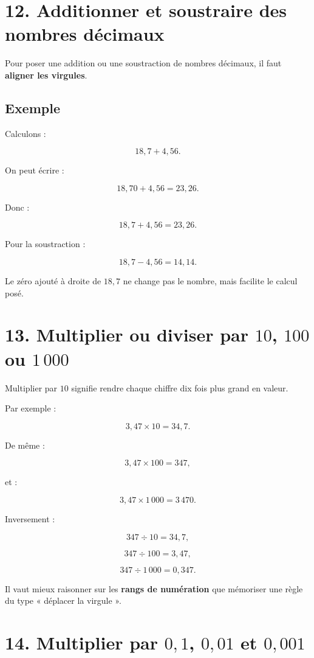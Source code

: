 \section{12. Additionner et soustraire des nombres décimaux}

Pour poser une addition ou une soustraction de nombres décimaux, il faut \textbf{aligner les virgules}.

\subsection{Exemple}

Calculons :

\[
18{,}7+4{,}56.
\]

On peut écrire :

\[
18{,}70+4{,}56=23{,}26.
\]

Donc :

\[
\boxed{18{,}7+4{,}56=23{,}26}.
\]

Pour la soustraction :

\[
18{,}7-4{,}56=14{,}14.
\]

Le zéro ajouté à droite de $18{,}7$ ne change pas le nombre, mais facilite le calcul posé.

\section{13. Multiplier ou diviser par $10$, $100$ ou $1\,000$}

Multiplier par $10$ signifie rendre chaque chiffre dix fois plus grand en valeur.

Par exemple :

\[
3{,}47\times10=34{,}7.
\]

De même :

\[
3{,}47\times100=347,
\]

et :

\[
3{,}47\times1\,000=3\,470.
\]

Inversement :

\[
347\div10=34{,}7,
\]

\[
347\div100=3{,}47,
\]

\[
347\div1\,000=0{,}347.
\]

Il vaut mieux raisonner sur les \textbf{rangs de numération} que mémoriser une règle du type « déplacer la virgule ».

\section{14. Multiplier par $0{,}1$, $0{,}01$ et $0{,}001$}

